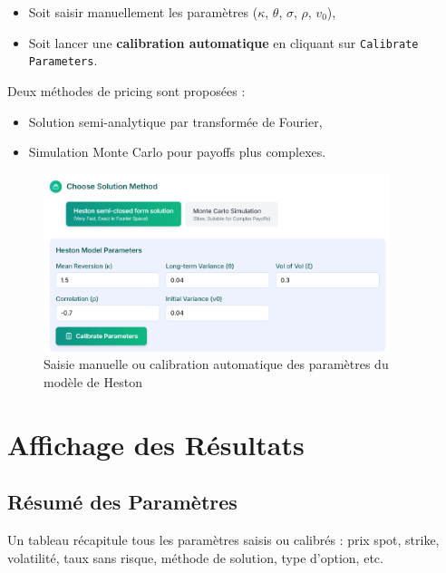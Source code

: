 \begin{itemize} \item Soit saisir manuellement les paramètres ($\kappa$, $\theta$, $\sigma$, $\rho$, $v_0$), \item Soit lancer une \textbf{calibration automatique} en cliquant sur \texttt{Calibrate Parameters}. \end{itemize}

Deux méthodes de pricing sont proposées : \begin{itemize} \item Solution semi-analytique par transformée de Fourier, \item Simulation Monte Carlo pour payoffs plus complexes. \end{itemize}

\begin{figure}[H] \centering \includegraphics[width=0.9\textwidth]{images/5.png} \caption{Saisie manuelle ou calibration automatique des paramètres du modèle de Heston} \end{figure}

\section{Affichage des Résultats}

\subsection{Résumé des Paramètres}

Un tableau récapitule tous les paramètres saisis ou calibrés : prix spot, strike, volatilité, taux sans risque, méthode de solution, type d'option, etc.

